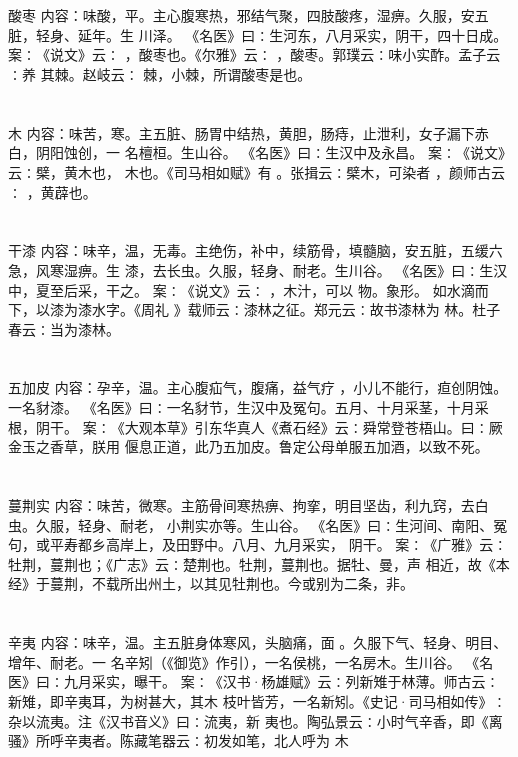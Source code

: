 \documentclass[12pt,UTF8]{ctexbook}
\begin{document}
\chapter{}酸枣
内容：味酸，平。主心腹寒热，邪结气聚，四肢酸疼，湿痹。久服，安五脏，轻身、延年。生 
川泽。 
《名医》曰∶生河东，八月采实，阴干，四十日成。 
案∶《说文》云∶ ，酸枣也。《尔雅》云∶ ，酸枣。郭璞云∶味小实酢。孟子云∶养 
其棘。赵岐云∶ 棘，小棘，所谓酸枣是也。 


\chapter{}木
内容：味苦，寒。主五脏、肠胃中结热，黄胆，肠痔，止泄利，女子漏下赤白，阴阳蚀创，一 
名檀桓。生山谷。 
《名医》曰∶生汉中及永昌。 
案∶《说文》云∶檗，黄木也， 木也。《司马相如赋》有 。张揖云∶檗木，可染者 
，颜师古云∶ ，黄薜也。 


\chapter{}干漆
内容：味辛，温，无毒。主绝伤，补中，续筋骨，填髓脑，安五脏，五缓六急，风寒湿痹。生 
漆，去长虫。久服，轻身、耐老。生川谷。 
《名医》曰∶生汉中，夏至后采，干之。 
案∶《说文》云∶ ，木汁，可以 物。象形。 如水滴而下，以漆为漆水字。《周礼 
》载师云∶漆林之征。郑元云∶故书漆林为 林。杜子春云∶当为漆林。 


\chapter{}五加皮
内容：孕辛，温。主心腹疝气，腹痛，益气疗 ，小儿不能行，疸创阴蚀。一名豺漆。 
《名医》曰∶一名豺节，生汉中及冤句。五月、十月采茎，十月采根，阴干。 
案∶《大观本草》引东华真人《煮石经》云∶舜常登苍梧山。曰∶厥金玉之香草，朕用 
偃息正道，此乃五加皮。鲁定公母单服五加酒，以致不死。 


\chapter{}蔓荆实
内容：味苦，微寒。主筋骨间寒热痹、拘挛，明目坚齿，利九窍，去白虫。久服，轻身、耐老， 
小荆实亦等。生山谷。 
《名医》曰∶生河间、南阳、冤句，或平寿都乡高岸上，及田野中。八月、九月采实， 
阴干。 
案∶《广雅》云∶牡荆，蔓荆也；《广志》云∶楚荆也。牡荆，蔓荆也。据牡、曼，声 
相近，故《本经》于蔓荆，不载所出州土，以其见牡荆也。今或别为二条，非。 


\chapter{}辛夷
内容：味辛，温。主五脏身体寒风，头脑痛，面 。久服下气、轻身、明目、增年、耐老。一 
名辛矧（《御览》作引），一名侯桃，一名房木。生川谷。 
《名医》曰∶九月采实，曝干。 
案∶《汉书·杨雄赋》云∶列新雉于林薄。师古云∶新雉，即辛夷耳，为树甚大，其木 
枝叶皆芳，一名新矧。《史记·司马相如传》∶杂以流夷。注《汉书音义》曰∶流夷，新 
夷也。陶弘景云∶小时气辛香，即《离骚》所呼辛夷者。陈藏笔器云∶初发如笔，北人呼为 
木 
\end{document}
